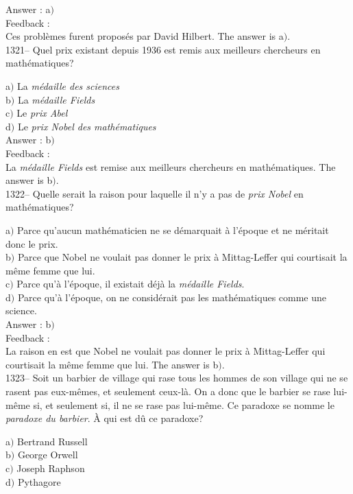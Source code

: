 ﻿\documentclass[letterpaper, 12pt]{article}
\begin{document}
Answer : a$)$\\

Feedback : \\
Ces probl\`emes furent propos\'es par David Hilbert.
The answer is  a$)$.\\

1321-- Quel prix existant depuis 1936 est remis aux meilleurs
chercheurs en math\'ematiques?

a$)$ La {\sl m\'edaille des sciences} \\
b$)$ La {\sl m\'edaille Fields} \\
c$)$ Le {\sl prix Abel} \\
d$)$ Le {\sl prix Nobel des math\'ematiques}\\

Answer : b$)$\\

Feedback : \\
La {\sl m\'edaille Fields} est remise aux meilleurs chercheurs en
math\'ematiques.
The answer is  b$)$.\\

1322-- Quelle serait la raison pour laquelle il n'y a pas de {\sl
prix Nobel} en math\'ematiques?

a$)$ Parce qu'aucun math\'ematicien ne se d\'emarquait \`a l'\'epoque et ne
m\'eritait donc le prix. \\
b$)$ Parce que Nobel ne voulait pas donner le prix \`a Mittag-Leffer qui
courtisait la m\^eme femme que lui. \\
c$)$ Parce qu'\`a l'\'epoque, il existait d\'ej\`a la {\sl m\'edaille
Fields}. \\
d$)$ Parce qu'\`a l'\'epoque, on ne consid\'erait pas les math\'ematiques
comme une science. \\

Answer : b$)$\\

Feedback : \\
La raison en est que Nobel ne voulait pas donner le prix \`a
Mittag-Leffer qui courtisait la m\^eme femme que lui.
The answer is  b$)$.\\

1323-- Soit un barbier de village qui rase tous les hommes de son
village qui ne se rasent pas eux-m\^emes, et seulement ceux-l\`a. On
a donc que le barbier se rase lui-m\^eme si, et seulement si, il ne
se rase pas lui-m\^eme. Ce paradoxe se nomme le {\sl paradoxe du
barbier}. \`A qui est d\^u ce paradoxe?

a$)$ Bertrand Russell \\
b$)$ George Orwell \\
c$)$ Joseph Raphson \\
d$)$ Pythagore\\
\end{document}
